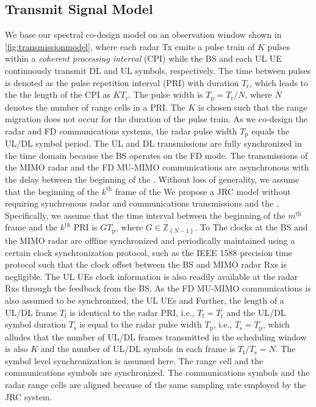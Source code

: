 \documentclass[10pt,journal]{IEEEtran}
\newcommand{\braces}[1]{{\left\{ {#1}\right\}}}
\newcommand{\ith}[1]    {{#1}^{\underline{\text{th}}}}
\newcommand{\sfrac}[2]{#1/#2}
\theoremstyle{definition}
\begin{document}
\subsection{Transmit Signal Model}
We base our spectral co-design model on an observation window shown in \figurename{\;\ref{fig:transmissionmodel}}, where each radar Tx emits a pulse train of $\mathit{K}$ pulses within a \textit{coherent processing interval} (CPI) while the BS and each UL UE continuously transmit DL and UL symbols, respectively. The time between  pulses is denoted as the pulse repetition interval (PRI) with duration $T_{\mathrm{r}}$, which leads to the the length of the CPI as $KT_{\mathrm{r}}$. The pulse width is $T_\mathrm{p}= T_\mathrm{r}/N$, where $N$ denotes the number of range cells in a PRI. The $\mathit{K}$ is chosen such that the range migration does not occur for the duration of the pulse train\cite{Xiaodong_Overlaid}.
As we co-design the radar and FD communications systems, the radar pulse width $T_{\mathrm{p}}$ equals the UL/DL symbol period.  
The UL and DL transmissions are fully synchronized in the time domain because the BS operates on the FD mode. The transmissions of the MIMO radar and the FD MU-MIMO communications are asynchronous with the delay between the beginning of the . Without loss of generality, we assume that the beginning of the $\ith{k}$ frame of the  
\color{red}We propose a JRC model without requiring synchronous radar and communications transmissions and the . Specifically, we assume that the time interval between the beginning of the $\ith{m}$ frame and the $\ith{k}$ PRI is $GT_{\mathrm{p}}$, where $G\in\mathbb{Z}_\braces{N-1}$.  To The clocks at the BS and the MIMO radar are offline synchronized and periodically maintained using a certain clock synchronization protocol, such as the IEEE 1588 precision time protocol\cite{wang2020displaced} such that the clock offset between the BS and MIMO radar Rxs is negligible. The UL UEs clock information is also readily available at the radar Rxs through the feedback from the BS. As the FD MU-MIMO communications is also assumed to be synchronized, the UL UEs and  
\color{black}Further, the length of a UL/DL frame $T_\mathrm{f}$ is identical to the radar PRI, i.e., $T_{\mathrm{f}}=T_{\mathrm{r}}$ and the UL/DL symbol duration $T_{\mathrm{s}}$ is equal to the radar pulse width $T_{\mathrm{p}}$, i.e., $T_{\mathrm{s}}=T_{\mathrm{p}}$, which alludes that the number of UL/DL frames transmitted in the scheduling window is also $\mathit{K}$ and the number of UL/DL symbols in each frame is $\sfrac{T_{\mathrm{f}}}{T_{\mathrm{s}}}=\mathit{N}$. The symbol level synchronization is assumed here. The range cell and the communications symbols are synchronized. The communications symbols and the radar range cells are aligned because of the same sampling rate employed by the JRC system.
\end{document}
